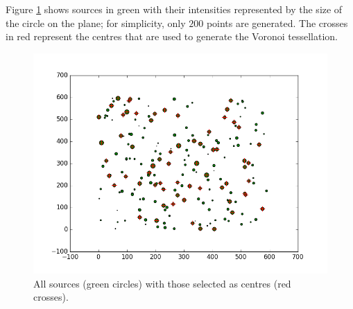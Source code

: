 \\
\\
Figure \ref{fig:source} shows sources in green with their intensities represented by the size of the circle on the plane; for simplicity, only $200$ points are generated. The crosses in red represent the centres that are used to generate the Voronoi tessellation.
\begin{figure}[H]
\includegraphics[width=\textwidth]{Images/sources.png}
\caption{ All sources (green circles) with those selected as centres (red crosses).}
\label{fig:source}
\end{figure}